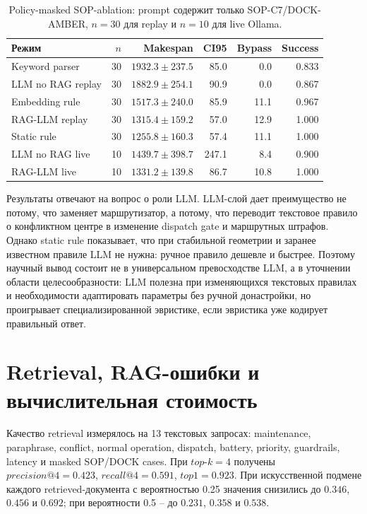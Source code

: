 \documentclass[runningheads]{llncs}
\begin{document}
\begin{table}[!htbp]
\centering
\caption{Policy-masked SOP-ablation: prompt содержит только SOP-C7/DOCK-AMBER, $n=30$ для replay и $n=10$ для live Ollama.}
\label{tab:masked}
\scriptsize
\begin{tabular}{lrrrrr}
\toprule
Режим & $n$ & Makespan & CI95 & Bypass & Success \\
\midrule
Keyword parser & 30 & $1932.3\pm237.5$ & 85.0 & 0.0 & 0.833 \\
LLM no RAG replay & 30 & $1882.9\pm254.1$ & 90.9 & 0.0 & 0.867 \\
Embedding rule & 30 & $1517.3\pm240.0$ & 85.9 & 11.1 & 0.967 \\
RAG-LLM replay & 30 & $1315.4\pm159.2$ & 57.0 & 12.9 & 1.000 \\
Static rule & 30 & $1255.8\pm160.3$ & 57.4 & 11.1 & 1.000 \\
LLM no RAG live & 10 & $1439.7\pm398.7$ & 247.1 & 8.4 & 0.900 \\
RAG-LLM live & 10 & $1331.2\pm139.8$ & 86.7 & 10.8 & 1.000 \\
\bottomrule
\end{tabular}
\end{table}

Результаты отвечают на вопрос о роли LLM. LLM-слой дает преимущество не потому, что заменяет маршрутизатор, а потому, что переводит текстовое правило о конфликтном центре в изменение dispatch gate и маршрутных штрафов. Однако static rule показывает, что при стабильной геометрии и заранее известном правиле LLM не нужна: ручное правило дешевле и быстрее. Поэтому научный вывод состоит не в универсальном превосходстве LLM, а в уточнении области целесообразности: LLM полезна при изменяющихся текстовых правилах и необходимости адаптировать параметры без ручной донастройки, но проигрывает специализированной эвристике, если эвристика уже кодирует правильный ответ.

\section{Retrieval, RAG-ошибки и вычислительная стоимость}

Качество retrieval измерялось на 13 текстовых запросах: maintenance, paraphrase, conflict, normal operation, dispatch, battery, priority, guardrails, latency и masked SOP/DOCK cases. При $top\text{-}k=4$ получены $precision@4=0.423$, $recall@4=0.591$, $top1=0.923$. При искусственной подмене каждого retrieved-документа с вероятностью 0.25 значения снизились до $0.346$, $0.456$ и $0.692$; при вероятности 0.5 -- до $0.231$, $0.358$ и $0.538$.
\end{document}
